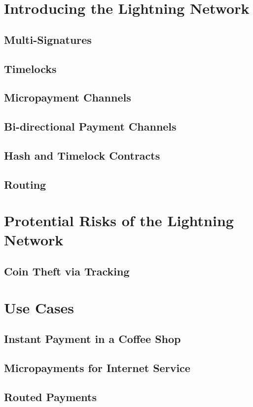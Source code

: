 \documentclass[a4paper, 12pt]{report}
\begin{document}
\chapter{Introducing the Lightning Network}
\section{Multi-Signatures}
\section{Timelocks}
\section{Micropayment Channels}
\section{Bi-directional Payment Channels}
\section{Hash and Timelock Contracts}
\section{Routing}

\chapter{Protential Risks of the Lightning Network}
\section{Coin Theft via Tracking}

\chapter{Use Cases}
\section{Instant Payment in a Coffee Shop}
\section{Micropayments for Internet Service}
\section{Routed Payments}
\end{document}
